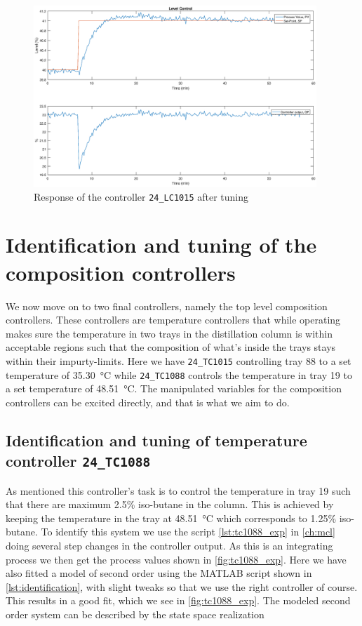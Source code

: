 \begin{figure}[ht!]
	\centering
	\includegraphics[width=0.95\textwidth]{fig/identification/lc1015_tuned.eps}
	\caption{Response of the controller  \texttt{24\_LC1015} after tuning}
	\label{fig:lc1015_tuned}
\end{figure}

\clearpage
\section{Identification and tuning of the composition controllers}
We now move on to two final controllers, namely the top level composition controllers. These controllers are temperature controllers that while operating makes sure the temperature in two trays in the distillation column is within acceptable regions such that the composition of what's inside the trays stays within their impurty-limits. Here we have \texttt{24\_TC1015} controlling tray 88 to a set temperature of \SI{35.30}{\degreeCelsius} while \texttt{24\_TC1088} controls the temperature in tray 19 to a set temperature of \SI{48.51}{\degreeCelsius}. The manipulated variables for the composition controllers can be excited directly, and that is what we aim to do.

\subsection{Identification and tuning of temperature controller \texttt{24\_TC1088}}
As mentioned this controller's task is to control the temperature in tray 19 such that there are maximum 2.5\% iso-butane in the column. This is achieved by keeping the temperature in the tray at \SI{48.51}{\degreeCelsius} which corresponds to 1.25\% iso-butane. To identify this system we use the script \autoref{lst:tc1088_exp} in \autoref{ch:mcl} doing several step changes in the controller output. As this is an integrating process we then get the process values shown in \autoref{fig:tc1088_exp}. Here we have also fitted a model of second order using the MATLAB script shown in \autoref{lst:identification}, with slight tweaks so that we use the right controller of course. This results in a good fit, which we see in \autoref{fig:tc1088_exp}. The modeled second order system can be described by the state space realization


